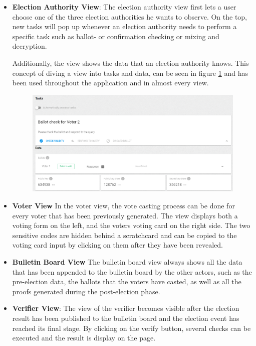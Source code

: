 \begin{itemize}
	\item \textbf{Election Authority View}: The election authority view first lets a user choose one of the three election authorities he wants to observe. On the top, new tasks will pop up whenever an election authority needs to perform a specific task such as ballot- or confirmation checking or mixing and decryption.

Additionally, the view shows the data that an election authority knows. This concept of diving a view into tasks and data, can be seen in figure \ref{Election Authority View} and has been used throughout the application and in almost every view.

\begin{figure}[p]
\begin{center}
\includegraphics[scale=0.43]{assets/screenshots/view.png}
\label{Election Authority View}%
\end{center}
\end{figure}

	\item \textbf{Voter View}
	In the voter view, the vote casting process can be done for every voter that has been previously generated. The view displays both a voting form on the left, and the voters voting card on the right side. The two sensitive codes are hidden behind a scratchcard and can be copied to the voting card input by clicking on them after they have been revealed.

	\item \textbf{Bulletin Board View} The bulletin board view always shows all the data that has been appended to the bulletin board by the other actors, such as the pre-election data, the ballots that the voters have casted, as well as all the proofs generated during the post-election phase.

	\item \textbf{Verifier View}: The view of the verifier becomes visible after the election result has been published to the bulletin board and the election event has reached its final stage. By clicking on the verify button, several checks can be executed and the result is display on the page.
\end{itemize}

